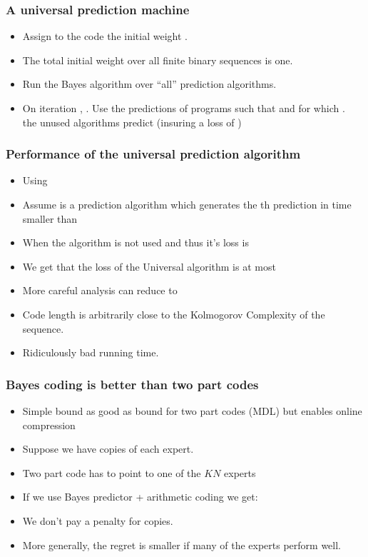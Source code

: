 \documentclass[handout]{beamer}
\begin{document}
\begin{frame}
\frametitle{A universal prediction machine}
\begin{itemize}
\item Assign to the code \R{$\vb$} the initial weight .
\item The total initial weight over all finite binary sequences is one.
\item Run the Bayes algorithm over ``all'' prediction algorithms.
\item {} On iteration , . 
Use the predictions of 
programs \R{$\vb$} such that  and for which
.\\
the unused algorithms predict  (insuring a loss of )
\end{itemize}
\end{frame}

\begin{frame}
\frametitle{Performance of the universal prediction algorithm}
\begin{itemize}
\item Using 
\item Assume  is a prediction algorithm which generates the 
th prediction in time smaller than 
\item When  the algorithm is not used and thus it's loss is 
\item We get that the loss of the Universal algorithm is at most 
\item More careful analysis can reduce  to 
\item Code length is arbitrarily close to the Kolmogorov Complexity of the sequence.
\item Ridiculously bad running time.
\end{itemize}
\end{frame}

\begin{frame}
\frametitle{Bayes coding is better than two part codes}
\begin{itemize}
\item
Simple bound as good as bound for two part codes (MDL) 
but enables online compression
\item Suppose we have  copies of each expert.
\item Two part code has to point to one of the $KN$ experts
\item If we use Bayes predictor + arithmetic coding we get:
\item We don't pay a penalty for copies.
\item More generally, the regret is smaller if many of the experts perform well.
\end{itemize}
\end{frame}
\end{document}
